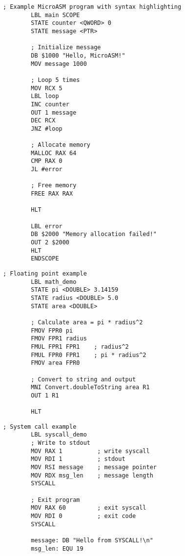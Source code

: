 \documentclass{article}
\begin{document}
	
	\begin{lstlisting}[style=MicroASMstyle]
		; Example MicroASM program with syntax highlighting
		LBL main SCOPE
		STATE counter <QWORD> 0
		STATE message <PTR>
		
		; Initialize message
		DB $1000 "Hello, MicroASM!"
		MOV message 1000
		
		; Loop 5 times
		MOV RCX 5
		LBL loop
		INC counter
		OUT 1 message
		DEC RCX
		JNZ #loop
		
		; Allocate memory
		MALLOC RAX 64
		CMP RAX 0
		JL #error
		
		; Free memory
		FREE RAX RAX
		
		HLT
		
		LBL error
		DB $2000 "Memory allocation failed!"
		OUT 2 $2000
		HLT
		ENDSCOPE
	\end{lstlisting}
	
	\begin{lstlisting}[style=MicroASMstyle]
		; Floating point example
		LBL math_demo
		STATE pi <DOUBLE> 3.14159
		STATE radius <DOUBLE> 5.0
		STATE area <DOUBLE>
		
		; Calculate area = pi * radius^2
		FMOV FPR0 pi
		FMOV FPR1 radius
		FMUL FPR1 FPR1    ; radius^2
		FMUL FPR0 FPR1    ; pi * radius^2
		FMOV area FPR0
		
		; Convert to string and output
		MNI Convert.doubleToString area R1
		OUT 1 R1
		
		HLT
	\end{lstlisting}
	
	\begin{lstlisting}[style=MicroASMstyle]
		; System call example
		LBL syscall_demo
		; Write to stdout
		MOV RAX 1          ; write syscall
		MOV RDI 1          ; stdout
		MOV RSI message    ; message pointer
		MOV RDX msg_len    ; message length
		SYSCALL
		
		; Exit program
		MOV RAX 60         ; exit syscall
		MOV RDI 0          ; exit code
		SYSCALL
		
		message: DB "Hello from SYSCALL!\n"
		msg_len: EQU 19
	\end{lstlisting}
	
\end{document}
